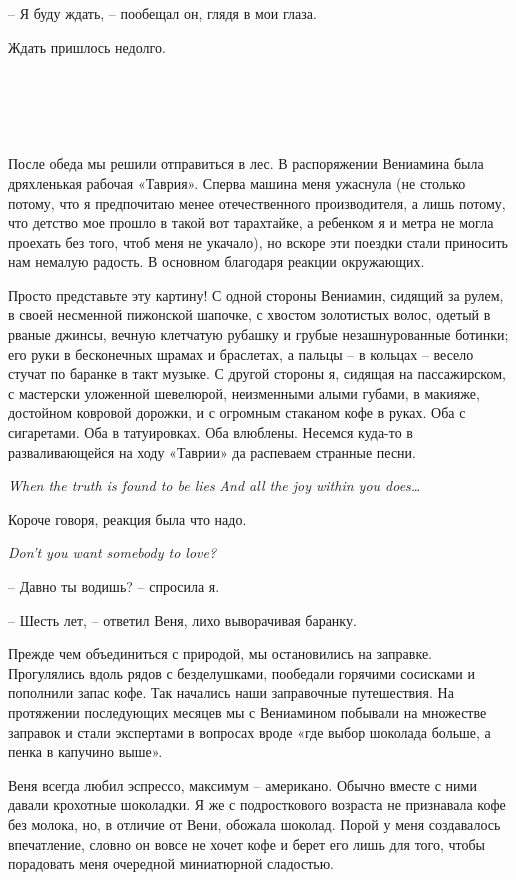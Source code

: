 \documentclass[
]{book}
\begin{document}
-- Я буду ждать, -- пообещал он, глядя в мои глаза.

Ждать пришлось недолго.

\hypertarget{chapter-12}{%
\chapter{~}\label{chapter-12}}

После обеда мы решили отправиться в лес. В распоряжении Вениамина была дряхленькая рабочая «Таврия». Сперва машина меня ужаснула (не столько потому, что я предпочитаю менее отечественного производителя, а лишь потому, что детство мое прошло в такой вот тарахтайке, а ребенком я и метра не могла проехать без того, чтоб меня не укачало), но вскоре эти поездки стали приносить нам немалую радость. В основном благодаря реакции окружающих.

Просто представьте эту картину! С одной стороны Вениамин, сидящий за рулем, в своей несменной пижонской шапочке, с хвостом золотистых волос, одетый в рваные джинсы, вечную клетчатую рубашку и грубые незашнурованные ботинки; его руки в бесконечных шрамах и браслетах, а пальцы -- в кольцах -- весело стучат по баранке в такт музыке. С другой стороны я, сидящая на пассажирском, с мастерски уложенной шевелюрой, неизменными алыми губами, в макияже, достойном ковровой дорожки, и с огромным стаканом кофе в руках. Оба с сигаретами. Оба в татуировках. Оба влюблены. Несемся куда-то в разваливающейся на ходу «Таврии» да распеваем странные песни.

\emph{When the truth is found to be lies}
\emph{And all the joy within you does\ldots{}}

Короче говоря, реакция была что надо.

\emph{Don't you want somebody to love?}

-- Давно ты водишь? -- спросила я.

-- Шесть лет, -- ответил Веня, лихо выворачивая баранку.

Прежде чем объединиться с природой, мы остановились на заправке. Прогулялись вдоль рядов с безделушками, пообедали горячими сосисками и пополнили запас кофе. Так начались наши заправочные путешествия. На протяжении последующих месяцев мы с Вениамином побывали на множестве заправок и стали экспертами в вопросах вроде «где выбор шоколада больше, а пенка в капучино выше».

Веня всегда любил эспрессо, максимум -- американо. Обычно вместе с ними давали крохотные шоколадки. Я же с подросткового возраста не признавала кофе без молока, но, в отличие от Вени, обожала шоколад. Порой у меня создавалось впечатление, словно он вовсе не хочет кофе и берет его лишь для того, чтобы порадовать меня очередной миниатюрной сладостью.
\end{document}
